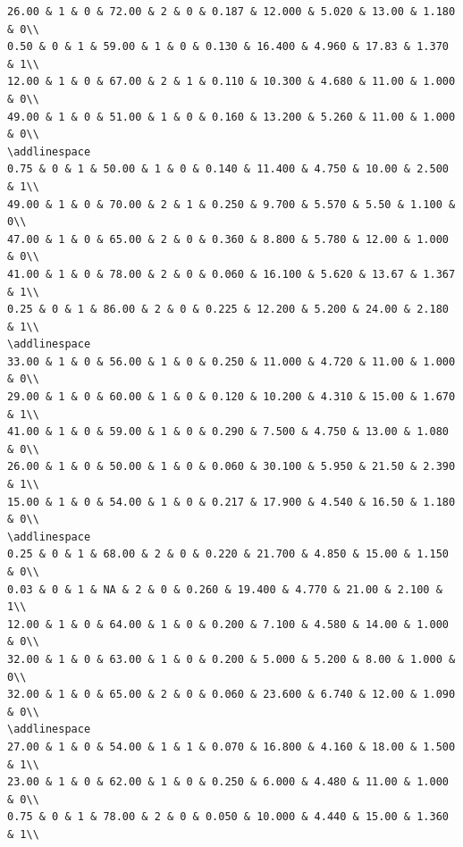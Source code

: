 \documentclass[
]{article}
\begin{document}
\begin{verbatim}
26.00 & 1 & 0 & 72.00 & 2 & 0 & 0.187 & 12.000 & 5.020 & 13.00 & 1.180 & 0\\
0.50 & 0 & 1 & 59.00 & 1 & 0 & 0.130 & 16.400 & 4.960 & 17.83 & 1.370 & 1\\
12.00 & 1 & 0 & 67.00 & 2 & 1 & 0.110 & 10.300 & 4.680 & 11.00 & 1.000 & 0\\
49.00 & 1 & 0 & 51.00 & 1 & 0 & 0.160 & 13.200 & 5.260 & 11.00 & 1.000 & 0\\
\addlinespace
0.75 & 0 & 1 & 50.00 & 1 & 0 & 0.140 & 11.400 & 4.750 & 10.00 & 2.500 & 1\\
49.00 & 1 & 0 & 70.00 & 2 & 1 & 0.250 & 9.700 & 5.570 & 5.50 & 1.100 & 0\\
47.00 & 1 & 0 & 65.00 & 2 & 0 & 0.360 & 8.800 & 5.780 & 12.00 & 1.000 & 0\\
41.00 & 1 & 0 & 78.00 & 2 & 0 & 0.060 & 16.100 & 5.620 & 13.67 & 1.367 & 1\\
0.25 & 0 & 1 & 86.00 & 2 & 0 & 0.225 & 12.200 & 5.200 & 24.00 & 2.180 & 1\\
\addlinespace
33.00 & 1 & 0 & 56.00 & 1 & 0 & 0.250 & 11.000 & 4.720 & 11.00 & 1.000 & 0\\
29.00 & 1 & 0 & 60.00 & 1 & 0 & 0.120 & 10.200 & 4.310 & 15.00 & 1.670 & 1\\
41.00 & 1 & 0 & 59.00 & 1 & 0 & 0.290 & 7.500 & 4.750 & 13.00 & 1.080 & 0\\
26.00 & 1 & 0 & 50.00 & 1 & 0 & 0.060 & 30.100 & 5.950 & 21.50 & 2.390 & 1\\
15.00 & 1 & 0 & 54.00 & 1 & 0 & 0.217 & 17.900 & 4.540 & 16.50 & 1.180 & 0\\
\addlinespace
0.25 & 0 & 1 & 68.00 & 2 & 0 & 0.220 & 21.700 & 4.850 & 15.00 & 1.150 & 0\\
0.03 & 0 & 1 & NA & 2 & 0 & 0.260 & 19.400 & 4.770 & 21.00 & 2.100 & 1\\
12.00 & 1 & 0 & 64.00 & 1 & 0 & 0.200 & 7.100 & 4.580 & 14.00 & 1.000 & 0\\
32.00 & 1 & 0 & 63.00 & 1 & 0 & 0.200 & 5.000 & 5.200 & 8.00 & 1.000 & 0\\
32.00 & 1 & 0 & 65.00 & 2 & 0 & 0.060 & 23.600 & 6.740 & 12.00 & 1.090 & 0\\
\addlinespace
27.00 & 1 & 0 & 54.00 & 1 & 1 & 0.070 & 16.800 & 4.160 & 18.00 & 1.500 & 1\\
23.00 & 1 & 0 & 62.00 & 1 & 0 & 0.250 & 6.000 & 4.480 & 11.00 & 1.000 & 0\\
0.75 & 0 & 1 & 78.00 & 2 & 0 & 0.050 & 10.000 & 4.440 & 15.00 & 1.360 & 1\\

\end{verbatim}
\end{document}
